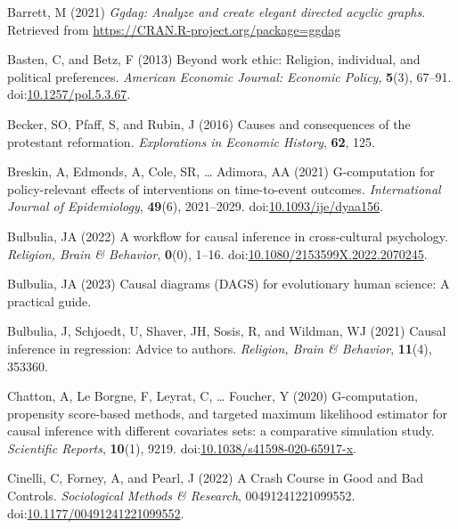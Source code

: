 \documentclass[
  singlecolumn,
  9pt]{article}
\begin{document}
\begin{CSLReferences}
Barrett, M (2021) \emph{Ggdag: Analyze and create elegant directed
acyclic graphs}. Retrieved from
\url{https://CRAN.R-project.org/package=ggdag}

Basten, C, and Betz, F (2013) Beyond work ethic: Religion, individual,
and political preferences. \emph{American Economic Journal: Economic
Policy}, \textbf{5}(3), 67--91.
doi:\href{https://doi.org/10.1257/pol.5.3.67}{10.1257/pol.5.3.67}.

Becker, SO, Pfaff, S, and Rubin, J (2016) Causes and consequences of the
protestant reformation. \emph{Explorations in Economic History},
\textbf{62}, 125.

Breskin, A, Edmonds, A, Cole, SR, \ldots{} Adimora, AA (2021)
G-computation for policy-relevant effects of interventions on
time-to-event outcomes. \emph{International Journal of Epidemiology},
\textbf{49}(6), 2021--2029.
doi:\href{https://doi.org/10.1093/ije/dyaa156}{10.1093/ije/dyaa156}.

Bulbulia, JA (2022) A workflow for causal inference in cross-cultural
psychology. \emph{Religion, Brain \& Behavior}, \textbf{0}(0), 1--16.
doi:\href{https://doi.org/10.1080/2153599X.2022.2070245}{10.1080/2153599X.2022.2070245}.

Bulbulia, JA (2023) Causal diagrams (DAGS) for evolutionary human
science: A practical guide.

Bulbulia, J, Schjoedt, U, Shaver, JH, Sosis, R, and Wildman, WJ (2021)
Causal inference in regression: Advice to authors. \emph{Religion, Brain
\& Behavior}, \textbf{11}(4), 353360.

Chatton, A, Le Borgne, F, Leyrat, C, \ldots{} Foucher, Y (2020)
G-computation, propensity score-based methods, and targeted maximum
likelihood estimator for causal inference with different covariates
sets: a comparative simulation study. \emph{Scientific Reports},
\textbf{10}(1), 9219.
doi:\href{https://doi.org/10.1038/s41598-020-65917-x}{10.1038/s41598-020-65917-x}.

Cinelli, C, Forney, A, and Pearl, J (2022) A Crash Course in Good and
Bad Controls. \emph{Sociological Methods \& Research},
00491241221099552.
doi:\href{https://doi.org/10.1177/00491241221099552}{10.1177/00491241221099552}.


\end{CSLReferences}
\end{document}
